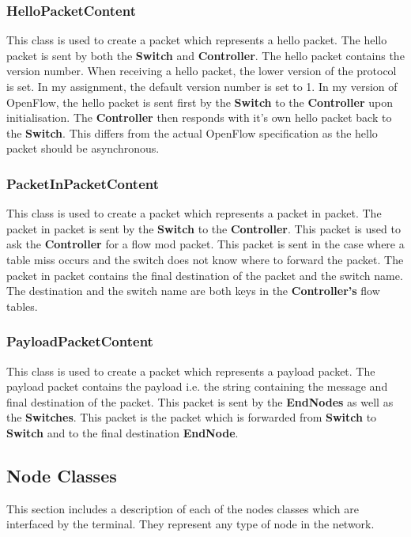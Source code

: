\documentclass{article}
\begin{document}
\subsubsection{HelloPacketContent}
This class is used to create a packet which represents a hello packet. The hello
packet is sent by both the \textbf{Switch} and \textbf{Controller}. The hello
packet contains the version number. When receiving a hello packet, the lower
version of the protocol is set. In my assignment, the default version number
is set to 1. In my version of OpenFlow, the hello packet is sent first by the
\textbf{Switch} to the \textbf{Controller} upon initialisation. The
\textbf{Controller} then responds with it's own hello packet back to the
\textbf{Switch}. This differs from the actual OpenFlow specification as the
hello packet should be asynchronous.

\subsubsection{PacketInPacketContent}
This class is used to create a packet which represents a packet in packet. The
packet in packet is sent by the \textbf{Switch} to the \textbf{Controller}.
This packet is used to ask the \textbf{Controller} for a flow mod packet. This
packet is sent in the case where a table miss occurs and the switch does not
know where to forward the packet. The packet in packet contains the final
destination of the packet and the switch name. The destination and the switch
name are both keys in the \textbf{Controller's} flow tables.

\subsubsection{PayloadPacketContent}
This class is used to create a packet which represents a payload packet. The
payload packet contains the payload i.e. the string containing the message and
final destination of the packet. This packet is sent by the \textbf{EndNodes}
as well as the \textbf{Switches}. This packet is the packet which is forwarded
from \textbf{Switch} to \textbf{Switch} and to the final destination
\textbf{EndNode}.

\subsection{Node Classes}
This section includes a description of each of the nodes classes which are
interfaced by the terminal. They represent any type of node in the network.
\end{document}
